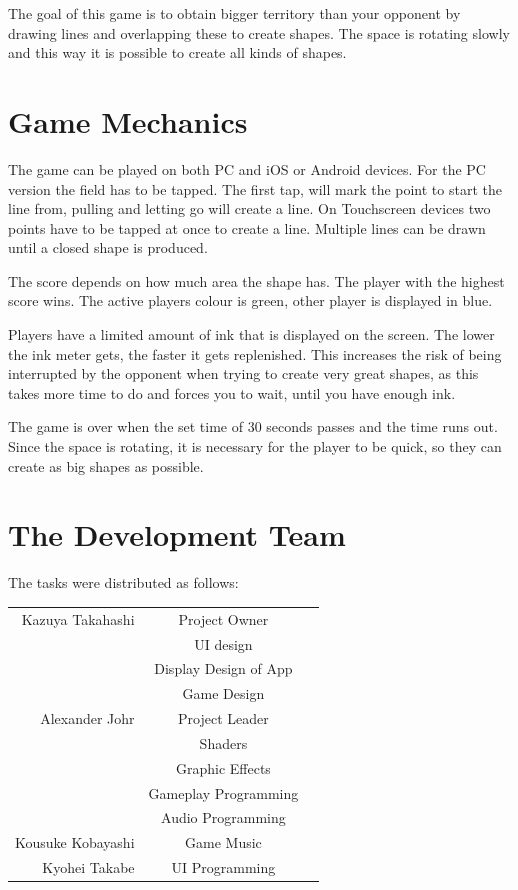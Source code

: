 The goal of this game is to obtain bigger territory than your opponent by drawing lines and overlapping these to create shapes.
The space is rotating slowly and this way it is possible to create all kinds of shapes.

\section{Game Mechanics}

The game can be played on both PC and iOS or Android devices.
For the PC version the field has to be tapped. The first tap, will mark the point to start the line from, pulling and letting go will create a line.
On Touchscreen devices two points have to be tapped at once to create a line.
Multiple lines can be drawn until a closed shape is produced.

The score depends on how much area the shape has. The player with the highest score wins.
The active players colour is green, other player is displayed in blue.

Players have a limited amount of ink that is displayed on the screen. The lower the ink meter gets, the faster it gets replenished. This increases the risk of being interrupted by the opponent when trying to create very great shapes, as this takes more time to do and forces you to wait, until you have enough ink.

The game is over when the set time of 30 seconds passes and the time runs out.
Since the space is rotating, it is necessary for the player to be quick, so they can create as big shapes as possible.

\section{The Development Team}

The tasks were distributed as follows:
\begin{center}
\begin{tabular}{r c l}
Kazuya Takahashi & Project Owner \\
                 & UI design \\
                 & Display Design of App \\
                 & Game Design \\
\hline
Alexander Johr   & Project Leader  \\
                 & Shaders \\
                 & Graphic Effects \\
                 & Gameplay Programming \\
								 & Audio Programming \\
\hline
Kousuke Kobayashi& Game Music  \\
\hline
Kyohei Takabe    & UI Programming  \\
\end{tabular}
\end{center}
